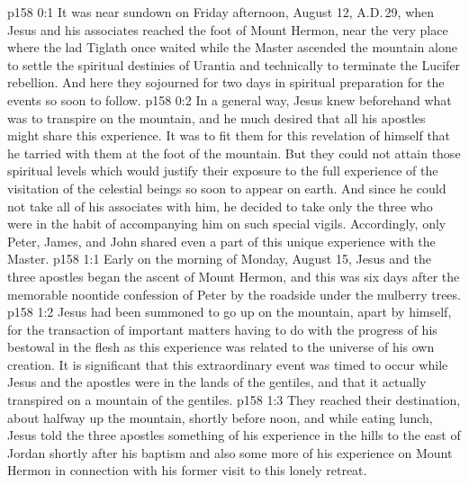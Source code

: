 \author{Midwayer Commission}
\vs p158 0:1 It was near sundown on Friday afternoon, August 12, A.D.\,29, when Jesus and his associates reached the foot of Mount Hermon, near the very place where the lad Tiglath once waited while the Master ascended the mountain alone to settle the spiritual destinies of Urantia and technically to terminate the Lucifer rebellion. And here they sojourned for two days in spiritual preparation for the events so soon to follow.
\vs p158 0:2 In a general way, Jesus knew beforehand what was to transpire on the mountain, and he much desired that all his apostles might share this experience. It was to fit them for this revelation of himself that he tarried with them at the foot of the mountain. But they could not attain those spiritual levels which would justify their exposure to the full experience of the visitation of the celestial beings so soon to appear on earth. And since he could not take all of his associates with him, he decided to take only the three who were in the habit of accompanying him on such special vigils. Accordingly, only Peter, James, and John shared even a part of this unique experience with the Master.
\vs p158 1:1 Early on the morning of Monday, August 15, Jesus and the three apostles began the ascent of Mount Hermon, and this was six days after the memorable noontide confession of Peter by the roadside under the mulberry trees.
\vs p158 1:2 Jesus had been summoned to go up on the mountain, apart by himself, for the transaction of important matters having to do with the progress of his bestowal in the flesh as this experience was related to the universe of his own creation. It is significant that this extraordinary event was timed to occur while Jesus and the apostles were in the lands of the gentiles, and that it actually transpired on a mountain of the gentiles.
\vs p158 1:3 They reached their destination, about halfway up the mountain, shortly before noon, and while eating lunch, Jesus told the three apostles something of his experience in the hills to the east of Jordan shortly after his baptism and also some more of his experience on Mount Hermon in connection with his former visit to this lonely retreat.
